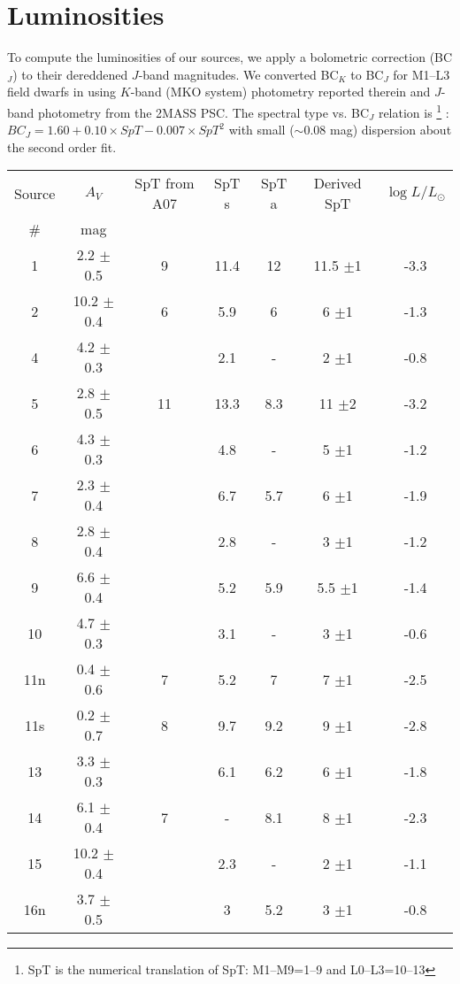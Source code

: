 \section{Luminosities}
To compute the luminosities of our sources, we apply a bolometric correction (BC$_J$) to their dereddened $J$-band magnitudes.  We converted BC$_K$ to BC$_J$ for M1--L3 field dwarfs in \citep{Golimowski04} using $K$-band (MKO system) photometry reported therein and $J$-band photometry from the 2MASS PSC.  The spectral type vs. BC$_J$ relation is \footnote{SpT is the numerical translation of SpT: M1--M9=1--9 and L0--L3=10--13} : $BC_J=1.60 + 0.10 \times SpT - 0.007 \times SpT^2$ with small ($\sim$0.08 mag) dispersion about the second order fit.

\smallskip
\begin{center}
{\small
\begin{table}
\begin{tabular}{ccccccc}
\hline
\noalign{\smallskip}
Source & $A_V$ & SpT from A07 & SpT s& SpT a & Derived SpT & $\log L/L_{\odot}$\\
\# &  mag &  & &  &  &\\
\noalign{\smallskip}
\hline
\noalign{\smallskip}
1	&	2.2	$\pm$	0.5	& 9 &	11.4	&	12	&	11.5	$\pm$1	&	-3.3	\\
2	&	10.2	$\pm$	0.4	& 6 &	5.9	&	6	&	6	$\pm$1	&	-1.3	\\
4	&	4.2	$\pm$	0.3	& &	2.1	&	-	&	2	$\pm$1	&	-0.8	\\
5	&	2.8	$\pm$	0.5	& 11&	13.3	&	8.3	&	11	$\pm$2	&	-3.2	\\
6	&	4.3	$\pm$	0.3	& &	4.8	&	-	&	5	$\pm$1	&	-1.2	\\
7	&	2.3	$\pm$	0.4	& &	6.7	&	5.7	&	6	$\pm$1	&	-1.9	\\
8	&	2.8	$\pm$	0.4	& &	2.8	&	-	&	3	$\pm$1	&	-1.2	\\
9	&	6.6	$\pm$	0.4	& &	5.2	&	5.9	&	5.5	$\pm$1	&	-1.4	\\
10	&	4.7	$\pm$	0.3	& &	3.1	&	-	&	3	$\pm$1	&	-0.6	\\
11n	&	0.4	$\pm$	0.6	& 7 &	5.2	&	7	&	7	$\pm$1	&	-2.5	\\
11s	&	0.2	$\pm$	0.7	& 8 &	9.7	&	9.2	&	9	$\pm$1	&	-2.8	\\
13	&	3.3	$\pm$	0.3	& &	6.1	&	6.2	&	6	$\pm$1	&	-1.8  \\
14	&	6.1	$\pm$	0.4	& 7 &	-	&	8.1	&	8	$\pm$1	&	-2.3	\\
15	&	10.2	$\pm$	0.4	& &	2.3	&	-	&	2	$\pm$1	&	-1.1	\\
16n	&	3.7	$\pm$	0.5	& &	3	&	5.2	&	3	$\pm$1	&	-0.8	\\

\end{tabular}
\end{table}}
\end{center}
